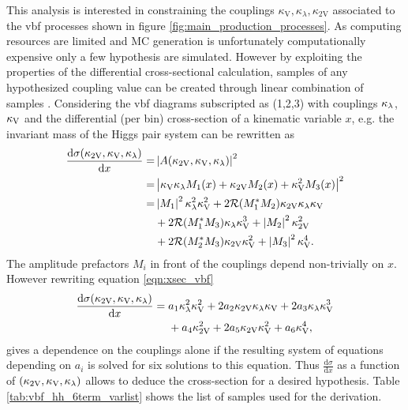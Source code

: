 This analysis is interested in constraining the couplings $\kappa_\text{V},\kappa_\lambda,\kappa_\text{2V}$ associated to the \ac{vbf} processes shown in figure \ref{fig:main_production_processes}. As computing resources are limited and MC generation is unfortunately computationally expensive only a few hypothesis are simulated. However by exploiting the properties of the differential cross-sectional calculation, samples of any hypothesized coupling value can be created through linear combination of samples \citep{ATLAS-CONF-2019-049}. Considering the \ac{vbf} diagrams subscripted as (1,2,3) with couplings $\kappa_\lambda$, $\kappa_\text{V}$ and \ktwov the differential (per bin) cross-section of a kinematic variable $x$, e.g. the invariant mass of the Higgs pair system can be rewritten as
\begin{align}
    \label{eqn:xsec_vbf}
    \frac{\mathrm{d}\sigma(\kappa_\text{2V}, \kappa_\text{V}, \kappa_\lambda )}{\mathrm{d} x } = &
    \left| A(\kappa_\text{2V}, \kappa_\text{V}, \kappa_\lambda ) \right|^2                                                                                               \\
    =                                                         & \left| \kappa_\text{V} \kappa_\lambda M_1(x    ) + \kappa_\text{2V} M_2(x  ) + \kappa_\text{V}^2 M_3(x   ) \right|^2 \\ \nonumber
    =                                                         & \left\vert M_1\right\vert^2 \kappa_\lambda^2 \kappa_\text{V}^2  + 2 \mathcal{R}(M_{1}^* M_{2})  \kappa_\text{2V} \kappa_\lambda \kappa_\text{V} \\ \nonumber
                                                              & + 2 \mathcal{R}(M_{1}^* M_{3}) \kappa_\lambda \kappa_\text{V}^3 + \left\vert M_2\right\vert^2  \kappa_\text{2V}^2        \\ \nonumber
                                                              & + 2 \mathcal{R}(M_{2}^* M_{3}) \kappa_\text{2V} \kappa_\text{V}^2 + \left\vert M_3\right\vert^2 \kappa_\text{V}^4.
\end{align}
The amplitude prefactors $M_i$ in front of the couplings depend non-trivially on $x$. However
rewriting equation \ref{eqn:xsec_vbf}
\begin{align}\label{eq:reweight}
    \frac{\mathrm{d}\sigma(\kappa_\text{2V}, \kappa_\text{V}, \kappa_\lambda )}{\mathrm{d} x}
    = \; & a_1 \kappa_\lambda^2 \kappa_\text{V}^2  + 2 a_2 \kappa_\text{2V} \kappa_\lambda \kappa_\text{V}  + 2 a_3 \kappa_\lambda \kappa_\text{V}^3  \\
         & + a_4 \kappa_\text{2V}^2     + 2 a_5 \kappa_\text{2V} \kappa_\text{V}^2 + a_6\kappa_\text{V}^4, \nonumber
\end{align}
gives a dependence on the couplings alone if the resulting system of equations depending on $a_i$ is solved for six solutions to this equation. Thus $\frac{\mathrm{d}\sigma}{\mathrm{d} x } $ as a function of $(\kappa_\text{2V}, \kappa_\text{V}, \kappa_\lambda )$ allows to deduce the cross-section for a desired hypothesis. Table \ref*{tab:vbf_hh_6term_varlist} shows the list of samples used for the derivation.
